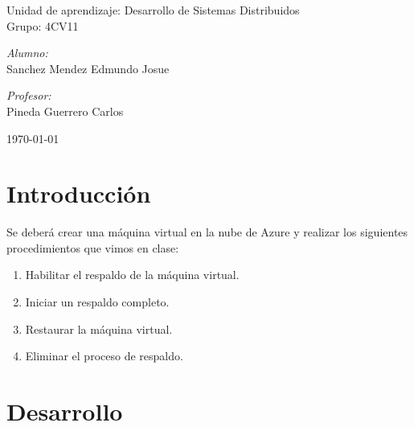 \documentclass[11pt]{article}
\begin{document}
\begin{titlepage}
\begin{center}
				{ \Large Unidad de aprendizaje: Desarrollo de Sistemas Distribuidos} \\[1cm]
				
				{ \Large Grupo: 4CV11 } \\[1cm]
				
				\noindent
				\begin{minipage}{0.5\textwidth}
					\begin{flushleft} \large
						\emph{Alumno:} \\
						Sanchez Mendez Edmundo Josue
					\end{flushleft}
				\end{minipage}%
				\begin{minipage}{0.5\textwidth}
					\begin{flushright} \large
						\emph{Profesor:} \\
						Pineda Guerrero Carlos 
					\end{flushright}
				\end{minipage}
				
				\vfill
				{\large {\today}}
			\end{center}
		\end{titlepage}
	
	\titlepage
	\tableofcontents
	\newpage
	
	\section{Introducción}
	Se deberá crear una máquina virtual en la nube de Azure y realizar los siguientes procedimientos que vimos en clase:
		\begin{enumerate}
			\item Habilitar el respaldo de la máquina virtual.
			\item Iniciar un respaldo completo.
			\item Restaurar la máquina virtual.
			\item Eliminar el proceso de respaldo.
		\end{enumerate}
	\section{Desarrollo}
\end{document}
